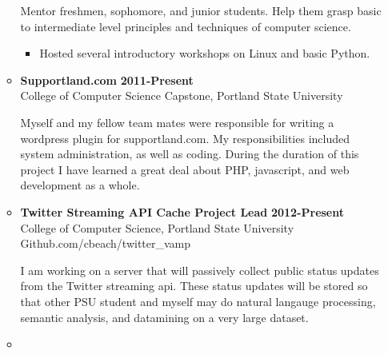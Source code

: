 \documentclass[overlapped]{res}
\begin{document}
\begin{resume}
\begin{itemize}[leftmargin=0in]
\begin{itemize}[leftmargin=0in]
\begin{samepage}
                    Mentor freshmen, sophomore, and junior students.  Help them grasp basic to intermediate level
                    principles and techniques of computer science.	
                    \begin{itemize}
                        \item[\textbullet] Hosted several introductory workshops on Linux and basic Python.
                    \end{itemize}
                \end{samepage}

            \item[] 
                \begin{samepage}
                    \textbf{Supportland.com} \hfill \textbf{2011-Present} \\
                    College of Computer Science Capstone, Portland State University \hfill

                    Myself and my fellow team mates were responsible for writing a wordpress plugin 
                    for supportland.com.  My responsibilities included system administration, as 
                    well as coding.  During the duration of this project I have learned a great
                    deal about PHP, javascript, and web development as a whole.
                \end{samepage}

            \item[] 
                \begin{samepage}

                    \textbf{Twitter Streaming API Cache Project Lead} \hfill \textbf{2012-Present} \\
                    College of Computer Science, Portland State University \\
                    Github.com/cbeach/twitter\_vamp 

                    I am working on a server that will passively collect public status updates from the
                    Twitter streaming api.  These status updates will be stored so that other PSU student
                    and myself may do natural langauge processing, semantic analysis, and datamining on
                    a very large dataset.				
                \end{samepage}

            \item[] 
                \begin{samepage}


\end{samepage}
\end{itemize}
\end{itemize}
\end{resume}
\end{document}
